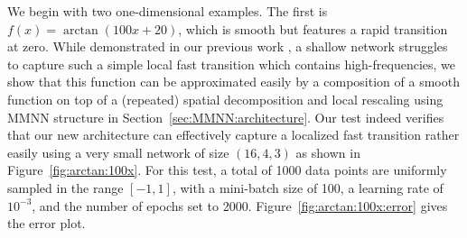 \documentclass[review,hidelinks,onefignum,onetabnum]{siamart250211}
\begin{document}
We begin with two one-dimensional examples. The first is $f(x) = \arctan(100x+20)$, which is smooth but features a rapid transition at zero. While demonstrated in our previous work \cite{ZZZZ-23}, a shallow network struggles to capture such a simple local fast transition which contains high-frequencies, we show that this function can be approximated easily by a composition of a smooth function on top of a (repeated) spatial decomposition and local rescaling using MMNN structure in Section~\ref{sec:MMNN:architecture}.  Our test indeed verifies that our new architecture can effectively capture a localized fast transition rather easily using a very small network of size $(16,4,3)$ as shown in Figure~\ref{fig:arctan:100x}. 
For this test, a total of 1000 data points are uniformly sampled in the range $[-1, 1]$, with a mini-batch size of 100, a learning rate of $10^{-3}$, and the number of epochs set to 2000. Figure~\ref{fig:arctan:100x:error} gives the error plot.
\end{document}
